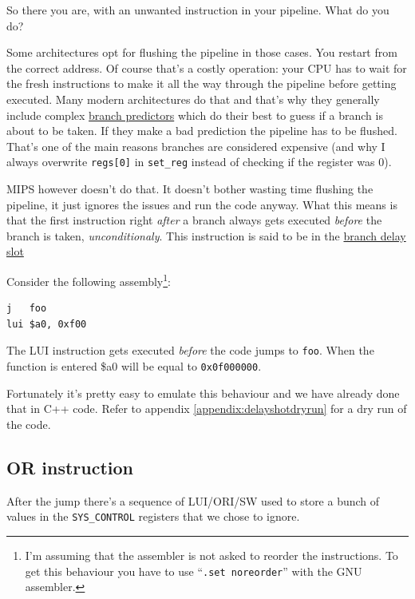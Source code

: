 \documentclass[a4paper]{article}
\newcommand{\code}[1] {\texttt{#1}}
\begin{document}
So there you are, with an unwanted instruction in your pipeline. What
do you do?

Some architectures opt for flushing the pipeline in those cases. You
restart from the correct address. Of course that's a costly operation:
your CPU has to wait for the fresh instructions to make it all the way
through the pipeline before getting executed. Many modern
architectures do that and that's why they generally include complex
\href{https://en.wikipedia.org/wiki/Branch_predictor}{branch
  predictors} which do their best to guess if a branch is about to be
taken. If they make a bad prediction the pipeline has to be
flushed. That's one of the main reasons branches are considered
expensive (and why I always overwrite \code{regs[0]} in
\code{set\_reg} instead of checking if the register was 0).

MIPS however doesn't do that. It doesn't bother wasting time flushing
the pipeline, it just ignores the issues and run the code anyway. What
this means is that the first instruction right \emph{after} a branch
always gets executed \emph{before} the branch is taken,
\emph{unconditionaly}. This instruction is said to be in the
\href{https://en.wikipedia.org/wiki/Delay_slot}{branch delay slot}

Consider the following assembly\footnote{I'm assuming that
  the assembler is not asked to reorder the instructions. To get this
  behaviour you have to use ``\code{.set noreorder}'' with the GNU
  assembler.}:

\begin{lstlisting}[language=assembly]
j   foo
lui $a0, 0xf00
\end{lstlisting}

The LUI instruction gets executed \emph{before} the code jumps to
\code{foo}. When the function is entered \$a0 will be equal to
\code{0x0f000000}.

Fortunately it's pretty easy to emulate this behaviour and we have
already done that in C++ code.  Refer to appendix \ref{appendix:delayshotdryrun}
for a dry run of the code.

\subsection{OR instruction}

After the jump there's a sequence of LUI/ORI/SW used to store a bunch
of values in the \code{SYS\_CONTROL} registers that we chose to
ignore.
\end{document}
